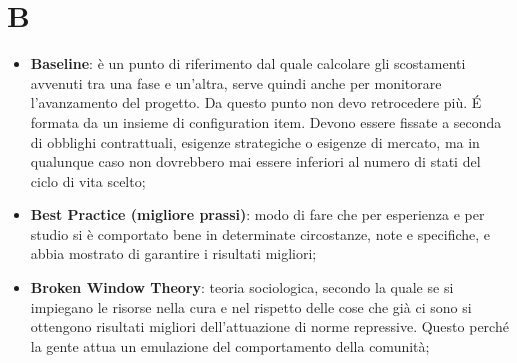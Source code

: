 % 
%
%



\section{B}

	\begin{itemize}
		\item \textbf{Baseline}: è un punto di riferimento dal quale calcolare gli scostamenti avvenuti tra una fase e un'altra, serve quindi anche per monitorare l'avanzamento del progetto. Da questo punto non devo retrocedere più. \'E formata da un insieme di configuration item. \newline
		Devono essere fissate a seconda di obblighi contrattuali, esigenze strategiche o esigenze di mercato, ma in qualunque caso non dovrebbero mai essere inferiori al numero di stati del ciclo di vita scelto;
		\item \textbf{Best Practice (migliore prassi)}: modo di fare che per esperienza e per studio si è comportato bene in determinate circostanze, note e specifiche, e abbia mostrato di garantire i risultati migliori;
		\item \textbf{Broken Window Theory}: teoria sociologica, secondo la quale se si impiegano le risorse nella cura e nel rispetto delle cose che già ci sono si ottengono risultati migliori dell'attuazione di norme repressive. Questo perché la gente attua un emulazione del comportamento della comunità;

	\end{itemize}